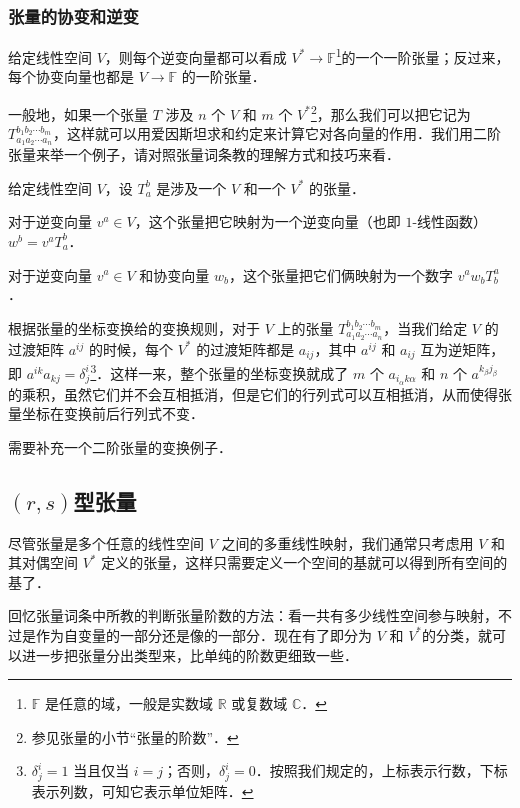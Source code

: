 \subsubsection{张量的协变和逆变}

给定线性空间 $V$，则每个逆变向量都可以看成 $V^*\rightarrow \mathbb{F}$\footnote{$\mathbb{F}$ 是任意的域，一般是实数域 $\mathbb{R}$ 或复数域 $\mathbb{C}$．}的一个一阶张量；反过来，每个协变向量也都是 $V\rightarrow \mathbb{F}$ 的一阶张量．

一般地，如果一个张量 $T$ 涉及 $n$ 个 $V$ 和 $m$ 个 $V^*$\footnote{参见张量的小节“张量的阶数”．}，那么我们可以把它记为 $T^{b_1b_2\cdots b_m}_{a_1a_2\cdots a_n}$，这样就可以用爱因斯坦求和约定来计算它对各向量的作用．我们用二阶张量来举一个例子，请对照张量词条教的理解方式和技巧来看．

\begin{example}{}
给定线性空间 $V$，设 $T^b_a$ 是涉及一个 $V$ 和一个 $V^*$ 的张量．

对于逆变向量 $v^a\in V$，这个张量把它映射为一个逆变向量（也即 $1$-线性函数）$w^b=v^aT^b_a$．

对于逆变向量 $v^a\in V$ 和协变向量 $w_b$，这个张量把它们俩映射为一个数字 $v^aw_bT^a_b$．
\end{example}

根据张量的坐标变换给的变换规则，对于 $V$ 上的张量 $T^{b_1b_2\cdots b_m}_{a_1a_2\cdots a_n}$，当我们给定 $V$ 的过渡矩阵 $a^{ij}$ 的时候，每个 $V^*$ 的过渡矩阵都是 $a_{ij}$，其中 $a^{ij}$ 和 $a_{ij}$ 互为逆矩阵，即 $a^{ik}a_{kj}=\delta^i_j$\footnote{$\delta^i_j=1$ 当且仅当 $i=j$；否则，$\delta^i_j=0$．按照我们规定的，上标表示行数，下标表示列数，可知它表示单位矩阵．}．这样一来，整个张量的坐标变换就成了 $m$ 个 $a_{i_\alpha k\alpha}$ 和 $n$ 个 $a^{k_\beta j_\beta}$ 的乘积，虽然它们并不会互相抵消，但是它们的行列式可以互相抵消，从而使得张量坐标在变换前后行列式不变．


\begin{issues}
需要补充一个二阶张量的变换例子．
\end{issues}


\subsection{$(r, s)$型张量}


尽管张量是多个任意的线性空间 $V$ 之间的多重线性映射，我们通常只考虑用 $V$ 和其对偶空间 $V^*$ 定义的张量，这样只需要定义一个空间的基就可以得到所有空间的基了．

回忆张量词条中所教的判断张量阶数的方法：看一共有多少线性空间参与映射，不过是作为自变量的一部分还是像的一部分．现在有了即分为 $V$ 和 $V^*$的分类，就可以进一步把张量分出类型来，比单纯的阶数更细致一些．

